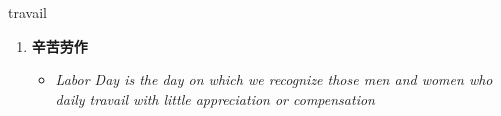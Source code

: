 
\begin{frame}
{\huge travail}
\begin{center}
\begin{enumerate}\Large
  \item \textbf{辛苦劳作}
  \begin{itemize}
    \item \em{\Large{Labor Day is the day on which we recognize those men and women who daily travail with little appreciation or compensation}}
  \end{itemize}
\end{enumerate}
\end{center}
\end{frame}
